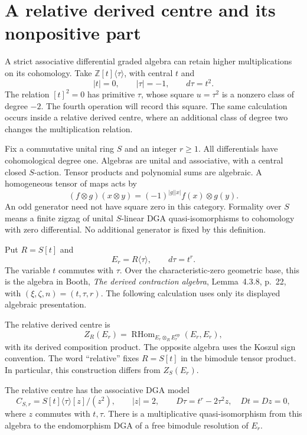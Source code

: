 \section{A relative derived centre and its nonpositive part}
\label{v4-arith:ks:relative-centre}

A strict associative differential graded algebra can retain higher
multiplications on its cohomology. Take $\mathbb Z[t]\langle\tau\rangle$, with central $t$ and
\[
 |t|=0,\qquad |\tau|=-1,\qquad d\tau=t^2.
\]
The relation $[t]^2=0$ has primitive $\tau$, whose square
$u=\tau^2$ is a nonzero class of degree $-2$.
The fourth operation will record this square.
The same calculation occurs inside a relative derived centre, where
an additional class of degree two changes the multiplication relation.

Fix a commutative unital ring $S$ and an integer $r\geq1$.
All differentials have cohomological degree one.
Algebras are unital and associative, with a central closed $S$-action.
Tensor products and polynomial sums are algebraic.
A homogeneous tensor of maps acts by
\[
 (f\otimes g)(x\otimes y)=(-1)^{|g||x|}f(x)\otimes g(y).
\]
An odd generator need not have square zero in this category.
Formality over $S$ means a finite zigzag of unital $S$-linear
DGA quasi-isomorphisms to cohomology with zero differential.
No additional generator is fixed by this definition.

Put $R=S[t]$ and
\[
 E_r=R\langle\tau\rangle,\qquad d\tau=t^r.
\]
The variable $t$ commutes with $\tau$.
Over the characteristic-zero geometric base, this is the algebra in
Booth, \emph{The derived contraction algebra}, Lemma~4.3.8, p.~22,
with $(\xi,\zeta,n)=(t,\tau,r)$.
The following calculation uses only its displayed algebraic presentation.

The relative derived centre is
\[
 Z_R(E_r)=\operatorname{RHom}_{E_r\otimes_R E_r^{\mathrm{op}}}
 (E_r,E_r),
\]
with its derived composition product.
The opposite algebra uses the Koszul sign convention.
The word ``relative'' fixes $R=S[t]$ in the bimodule tensor product.
In particular, this construction differs from $Z_S(E_r)$.

\begin{proposition}
\label{v4-arith:ks:centre-model}
\ClaimStatusProvedHere{}
The relative centre has the associative DGA model
\[
 C_{S,r}=S[t]\langle\tau\rangle[z]/(z^2),\qquad
 |z|=2,\qquad
 D\tau=t^r-2\tau^2z,\quad Dt=Dz=0,
\]
where $z$ commutes with $t,\tau$.
There is a multiplicative quasi-isomorphism from this algebra to the
endomorphism DGA of a free bimodule resolution of $E_r$.
\end{proposition}

